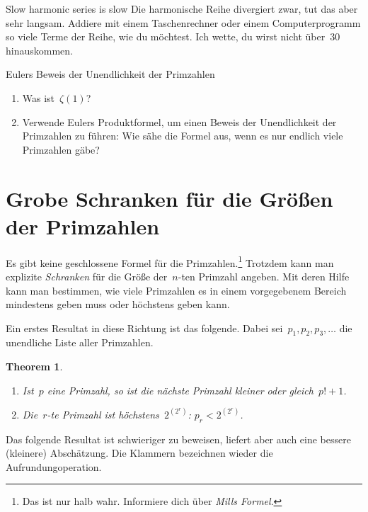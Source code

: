 \documentclass[twoside]{../zirkelblatt1415}
\theoremstyle{definition}
\theoremstyle{plain}
\newtheorem{thm}[defn]{Theorem}
\theoremstyle{remark}
\begin{document}
\begin{aufgabe}{Slow harmonic series is slow}
Die harmonische Reihe divergiert zwar, tut das aber sehr langsam. Addiere mit
einem Taschenrechner oder einem Computerprogramm so viele Terme der Reihe, wie
du möchtest. Ich wette, du wirst nicht über~$30$ hinauskommen.
\end{aufgabe}

\begin{aufgabe}{Eulers Beweis der Unendlichkeit der Primzahlen}
\begin{enumerate}
\item Was ist~$\zeta(1)$?
\item Verwende Eulers Produktformel, um einen Beweis der
Unendlichkeit der Primzahlen zu führen: Wie sähe die Formel aus, wenn es nur
endlich viele Primzahlen gäbe?
\end{enumerate}\fixlistspacing
\end{aufgabe}


\section{Grobe Schranken für die Größen der Primzahlen}

Es gibt keine geschlossene Formel für die Primzahlen.\footnote{Das ist nur halb
wahr. Informiere dich über \emph{Mills Formel}.} Trotzdem kann man explizite
\emph{Schranken} für die Größe der~$n$-ten Primzahl angeben. Mit deren Hilfe
kann man bestimmen, wie viele Primzahlen es in einem vorgegebenem Bereich
mindestens geben muss oder höchstens geben kann.

Ein erstes Resultat in diese Richtung ist das folgende. Dabei
sei~$p_1,p_2,p_3,\ldots$ die unendliche Liste aller Primzahlen.

\begin{thm}\label{thm:schranke1}\ \\[-2em]
\begin{enumerate}
\item
Ist~$p$ eine Primzahl, so ist die nächste Primzahl kleiner oder gleich~$p! + 1$. \\[-2em]
\item
Die~$r$-te Primzahl ist höchstens~$2^{(2^r)}$: $p_r < 2^{(2^r)}$.
\end{enumerate}
\end{thm}

Das folgende Resultat ist schwieriger zu beweisen, liefert aber auch eine
bessere (kleinere) Abschätzung. Die Klammern bezeichnen wieder die
Aufrundungoperation.
\end{document}
